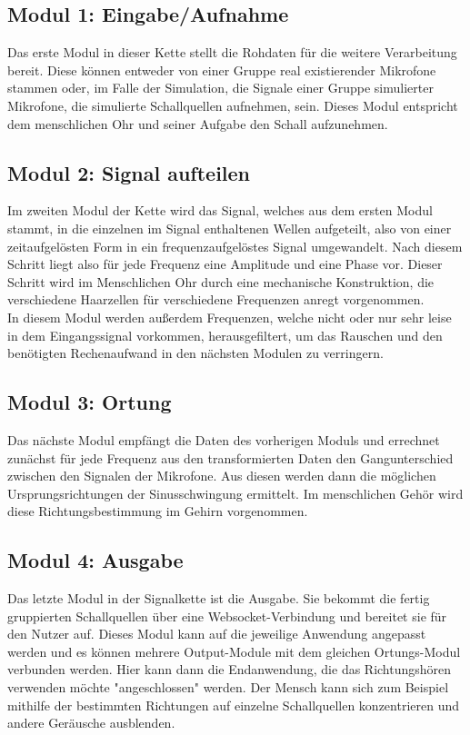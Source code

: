 \subsection{Modul 1: Eingabe/Aufnahme}
Das erste Modul in dieser Kette stellt die Rohdaten für die weitere Verarbeitung bereit. Diese  können entweder von einer Gruppe real existierender Mikrofone stammen oder, im Falle der Simulation, die Signale einer Gruppe simulierter Mikrofone, die simulierte Schallquellen aufnehmen, sein. Dieses Modul entspricht dem menschlichen Ohr und seiner Aufgabe den Schall aufzunehmen. 

\subsection{Modul 2: Signal aufteilen}
Im zweiten Modul der Kette wird das Signal, welches aus dem ersten Modul stammt, in die einzelnen im Signal enthaltenen Wellen aufgeteilt, also von einer zeitaufgelösten Form in ein frequenzaufgelöstes Signal umgewandelt. Nach diesem Schritt liegt also für jede Frequenz eine Amplitude und eine Phase vor. Dieser Schritt wird im Menschlichen Ohr durch eine mechanische Konstruktion, die verschiedene Haarzellen für verschiedene Frequenzen anregt vorgenommen.\\
In diesem Modul werden außerdem Frequenzen, welche nicht oder nur sehr leise in dem Eingangssignal vorkommen, herausgefiltert, um das Rauschen und den benötigten Rechenaufwand in den nächsten Modulen zu verringern.\\

\subsection{Modul 3: Ortung}
Das nächste Modul empfängt die Daten des vorherigen Moduls und errechnet zunächst für jede Frequenz aus den transformierten Daten den Gangunterschied zwischen den Signalen der Mikrofone. Aus diesen werden dann die möglichen Ursprungsrichtungen der Sinusschwingung ermittelt. Im menschlichen Gehör wird diese Richtungsbestimmung im Gehirn vorgenommen.

\subsection{Modul 4: Ausgabe}
Das letzte Modul in der Signalkette ist die Ausgabe. Sie bekommt die fertig gruppierten Schallquellen über eine Websocket-Verbindung und bereitet sie für den Nutzer auf. Dieses Modul kann auf die jeweilige Anwendung angepasst werden und es können mehrere Output-Module mit dem gleichen Ortungs-Modul verbunden werden. Hier kann dann die Endanwendung, die das Richtungshören verwenden möchte "angeschlossen" werden. Der Mensch kann sich zum Beispiel mithilfe der bestimmten Richtungen auf einzelne Schallquellen konzentrieren und andere Geräusche ausblenden. 